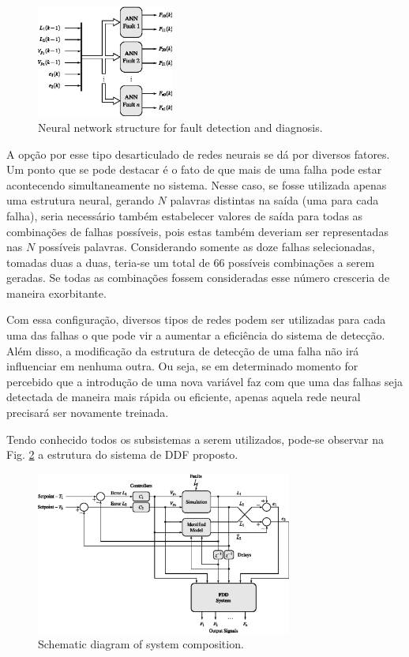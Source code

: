 \documentclass[10pt,fleqn,a4paper]{article}
\begin{document}
\begin{figure}[htb]
\centering
    \includegraphics[width=0.4\textwidth]{imgs/ann_fdd}
    \caption{Neural network structure for fault detection and diagnosis.}
    \label{fig:ann_fdd}
\end{figure}

A opção por esse tipo desarticulado de redes neurais se dá por diversos fatores.
Um ponto que se pode destacar é o fato de que mais de uma falha pode estar
acontecendo simultaneamente no sistema. Nesse caso, se fosse utilizada apenas
uma estrutura neural, gerando $N$ palavras distintas na saída (uma para cada
falha), seria necessário também estabelecer valores de saída para todas as
combinações de falhas possíveis, pois estas também deveriam ser representadas
nas $N$ possíveis palavras.  Considerando somente as doze falhas selecionadas,
tomadas duas a duas, teria-se um total de 66 possíveis combinações a serem
geradas. Se todas as combinações fossem consideradas esse número cresceria de
maneira exorbitante.

Com essa configuração, diversos tipos de redes podem ser utilizadas para cada
uma das falhas o que pode vir a aumentar a eficiência do sistema de detecção.
Além disso, a modificação da estrutura de detecção de uma falha não
irá influenciar em nenhuma outra. Ou seja, se em determinado momento for
percebido que a introdução de uma nova variável faz com que uma das falhas seja
detectada de maneira mais rápida ou eficiente, apenas aquela rede neural
precisará ser novamente treinada.

Tendo conhecido todos os subsistemas a serem utilizados, pode-se observar na
Fig. \ref{fig:comp} a estrutura do sistema de DDF proposto.

\begin{figure}[htb]
\centering
    \includegraphics[width=0.75\textwidth]{imgs/comp}
    \caption{Schematic diagram of system composition.}
    \label{fig:comp}
\end{figure}
\end{document}
